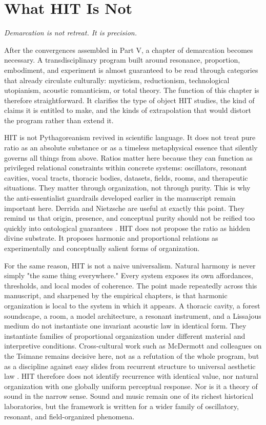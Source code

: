 \chapter{What HIT Is Not}

\epigraph{\emph{Demarcation is not retreat. It is precision.}}{}


After the convergences assembled in Part V, a chapter of demarcation becomes necessary. A transdisciplinary program built around resonance, proportion, embodiment, and experiment is almost guaranteed to be read through categories that already circulate culturally: mysticism, reductionism, technological utopianism, acoustic romanticism, or total theory. The function of this chapter is therefore straightforward. It clarifies the type of object HIT studies, the kind of claims it is entitled to make, and the kinds of extrapolation that would distort the program rather than extend it.

HIT is not Pythagoreanism revived in scientific language. It does not treat pure ratio as an absolute substance or as a timeless metaphysical essence that silently governs all things from above. Ratios matter here because they can function as privileged relational constraints within concrete systems: oscillators, resonant cavities, vocal tracts, thoracic bodies, datasets, fields, rooms, and therapeutic situations. They matter through organization, not through purity. This is why the anti-essentialist guardrails developed earlier in the manuscript remain important here. Derrida and Nietzsche are useful at exactly this point. They remind us that origin, presence, and conceptual purity should not be reified too quickly into ontological guarantees \parencite{derrida_1967,nietzsche_1873}. HIT does not propose the ratio as hidden divine substrate. It proposes harmonic and proportional relations as experimentally and conceptually salient forms of organization.

For the same reason, HIT is not a naive universalism. Natural harmony is never simply "the same thing everywhere." Every system exposes its own affordances, thresholds, and local modes of coherence. The point made repeatedly across this manuscript, and sharpened by the empirical chapters, is that harmonic organization is local to the system in which it appears. A thoracic cavity, a forest soundscape, a room, a model architecture, a resonant instrument, and a Lissajous medium do not instantiate one invariant acoustic law in identical form. They instantiate families of proportional organization under different material and interpretive conditions. Cross-cultural work such as McDermott and colleagues on the Tsimane remains decisive here, not as a refutation of the whole program, but as a discipline against easy slides from recurrent structure to universal aesthetic law \parencite{mcdermott_2016}. HIT therefore does not identify recurrence with identical value, nor natural organization with one globally uniform perceptual response. Nor is it a theory of sound in the narrow sense. Sound and music remain one of its richest historical laboratories, but the framework is written for a wider family of oscillatory, resonant, and field-organized phenomena.

